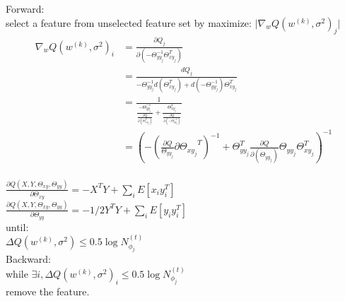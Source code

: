 \documentclass{article}
\begin{document}
Forward: \\
select a feature from unselected feature set by maximize: 
$ \lvert \nabla_w Q(w^{(k)}, \sigma^2)_j \rvert $ \\

\begin{align*}
\nabla_w Q(w^{(k)}, \sigma^2)_i & = \frac{\partial Q_j}{
	\partial (-\Theta^{-1}_{yy_j}\Theta^T_{xy_j}) } \\
	& = \frac{d Q_j}{
		-\Theta^{-1}_{yy_j}d(\Theta^T_{xy_j}) + d(-\Theta^{-1}_{yy_j}) \Theta^T_{xy_j} } \\
	& = \frac{1}{ \frac{-\Theta^{-1}_{yy_j}}{ \frac{\partial Q}{\partial(\Theta^T_{xy_j}) }}
		+\frac{\Theta^T_{xy_j}}{ \frac{\partial Q}{\partial(-\Theta^{-1}_{yy_j})}} } \\
	& = \left({ - ({\frac{\partial Q} {\Theta_{yy_j}} {\partial\Theta_{xy_j}}^T})^{-1}
		+ {\Theta^T_{yy_j}} {\frac{\partial Q}{\partial(\Theta_{yy_j})}
			\Theta_{yy_j}\Theta_{xy_j}^T} }\right)^{-1} \\
\end{align*} 

$ \displaystyle \frac{\partial Q (X,Y,\Theta_{xy},\Theta_{yy})}{\partial \Theta_{xy}} =
	-X^T Y + \sum_i E[x_i y_i^T] $ \\
$ \displaystyle \frac{\partial Q (X,Y,\Theta_{xy},\Theta_{yy})}{\partial \Theta_{yy}} =
-1/2Y^T Y + \sum_i E[y_i y_i^T] $ \\

until: \\
$ \Delta Q(w^{(k)},\sigma^2) \le 0.5\log N_{\phi_j}^{(t)} $ \\

Backward: \\
while $ \exists i, \Delta Q(w^{(k)}, \sigma^2)_i \le 0.5\log N_{\phi_j}^{(t)} $ \\
remove the feature.
\end{document}
